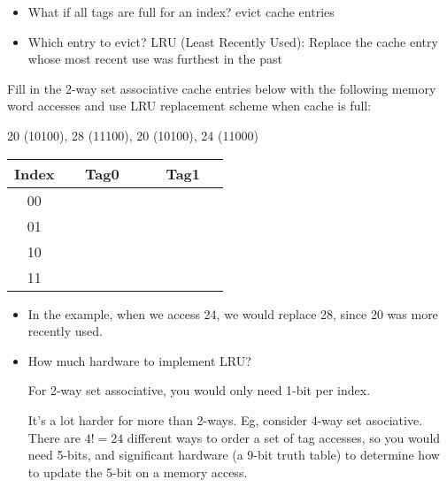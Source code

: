 \begin{frame}[fragile]
\begin{itemize}
	\item What if all tags are full for an index? evict cache entries
	\item Which entry to evict? LRU (Least Recently Used): Replace the cache entry whose most recent use was furthest in the past
  \end{itemize}

 \begin{tcolorbox}[enhanced,attach boxed title to top center={yshift=-3mm,yshifttext=-1mm},
  colback=red!5!white,colframe=red!75!black,colbacktitle=red!80!black,
  title=Try this,fonttitle=\bfseries,
  boxed title style={size=small,colframe=red!50!black} ]
Fill in the 2-way set associative cache entries below with the following memory word accesses and use LRU replacement scheme when cache is full:

	20 (10100), 28 (11100), 20 (10100), 24 (11000)

\begin{center}
\begin{tabular}[t]{|c|c|c|}
\hline
Index & ~~Tag0~~ & ~~Tag1~~\\
\hline
00 & &\\
01 & &\\
\hline
10 & &\\
11 & &\\
\hline
\end{tabular}
\end{center}
  \end{tcolorbox}
  
\BNotes\ifnum{}
\begin{itemize}
\item In the example, when we access 24, we would replace 28, since 20
	was more recently used.
\item How much hardware to implement LRU?

	For 2-way set associative, you would only need 1-bit per index.

	It's a lot harder for more than 2-ways.  Eg, consider 4-way set
	asociative.  There are $4!=24$ different ways to order a set of
	tag accesses, so you would need 5-bits, and significant hardware
	(a 9-bit truth table) to determine how to update the 5-bit on a
	memory access.
\end{itemize}
\fi\ENotes
\end{frame}

